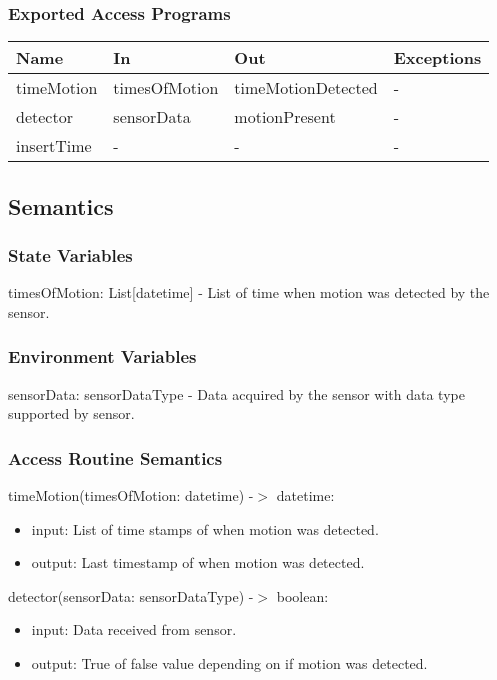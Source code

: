 \documentclass[12pt, titlepage]{article}
\begin{document}
\subsubsection{Exported Access Programs}

\begin{center}
\begin{tabular}{p{2cm} p{4cm} p{4cm} p{2cm}}
\hline
\textbf{Name} & \textbf{In} & \textbf{Out} & \textbf{Exceptions} \\
\hline
timeMotion & timesOfMotion & timeMotionDetected & - \\
detector & sensorData & motionPresent & - \\
insertTime & - & - & - \\
\hline
\end{tabular}
\end{center}

\subsection{Semantics}

\subsubsection{State Variables}

timesOfMotion: List[datetime] - List of time when motion was detected by the sensor.

\subsubsection{Environment Variables}
sensorData: sensorDataType - Data acquired by the sensor with data type supported by sensor.

\subsubsection{Access Routine Semantics}

\noindent timeMotion(timesOfMotion: datetime) -$>$ datetime:
\begin{itemize}
\item input: List of time stamps of when motion was detected. 
\item output: Last timestamp of when motion was detected. 
\end{itemize}

\noindent detector(sensorData: sensorDataType) -$>$ boolean:
\begin{itemize}
\item input: Data received from sensor. 
\item output: True of false value depending on if motion was detected. 
\end{itemize}
\end{document}
